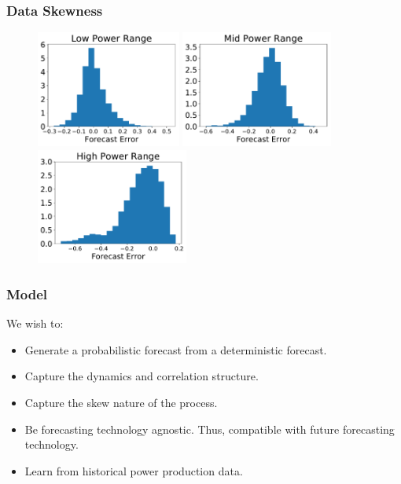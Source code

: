 \documentclass[aspectratio=169]{beamer}\usepackage[utf8]{inputenc}
\begin{document}
\begin{frame}\frametitle{Data Skewness}
\begin{figure}
  \includegraphics[width=47.5mm,scale=1]{plots/hist_low.pdf}
  \includegraphics[width=50mm,scale=1]{plots/hist_mid.pdf}
  \includegraphics[width=50mm,scale=1]{plots/hist_high.pdf}
\end{figure}
\end{frame}

\begin{frame}\frametitle{Model}
We wish to:
\begin{itemize}
  \item Generate a probabilistic forecast from a deterministic forecast.
  \item Capture the dynamics and correlation structure.
  \item Capture the skew nature of the process.
  \item Be forecasting technology agnostic. Thus, compatible with future forecasting technology.
  \item Learn from historical power production data.
\end{itemize}
\end{frame}
\end{document}
